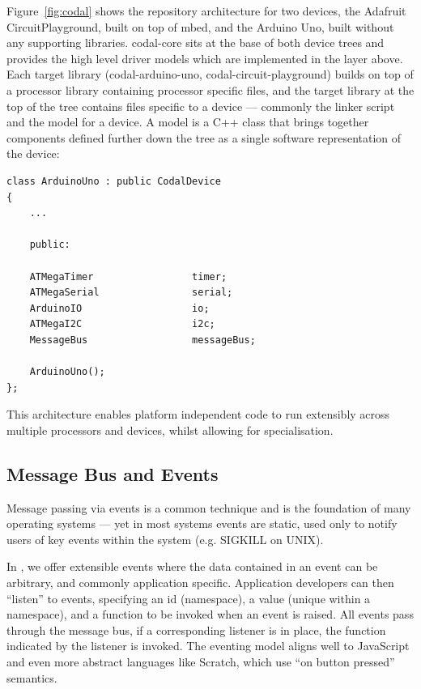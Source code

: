 Figure~\ref{fig:codal} shows the repository architecture for two \CO devices, the Adafruit CircuitPlayground, built on top of mbed, and the Arduino Uno, built without any supporting libraries. codal-core sits at the base of both device trees and provides the high level driver models which are implemented in the layer above. Each target library (codal-arduino-uno, codal-circuit-playground) builds on top of a processor library containing processor specific files, and the target library at the top of the tree contains files specific to a device --- commonly the linker script and the model for a device. A model is a C++ class that brings together components defined further down the tree as a single software representation of the device:

\begin{lstlisting}
class ArduinoUno : public CodalDevice
{
    ...

    public:

    ATMegaTimer                 timer;
    ATMegaSerial                serial;
    ArduinoIO                   io;
    ATMegaI2C                   i2c;
    MessageBus                  messageBus;

    ArduinoUno();
};
\end{lstlisting}

This architecture enables platform independent code to run extensibly across multiple processors and devices, whilst allowing for specialisation.

\subsection{Message Bus and Events}

Message passing via events is a common technique and is the foundation of many operating systems --- yet in most systems events are static, used only to notify users of key events within the system (e.g. SIGKILL on UNIX).

In \CO, we offer extensible events where the data contained in an event can be arbitrary, and commonly application specific. Application developers can then ``listen'' to events, specifying an id (namespace), a value (unique within a namespace), and a function to be invoked when an event is raised. All events pass through the message bus, if a corresponding listener is in place, the function indicated by the listener is invoked. The eventing model aligns well to JavaScript and even more abstract languages like Scratch, which use ``on button pressed'' semantics.

